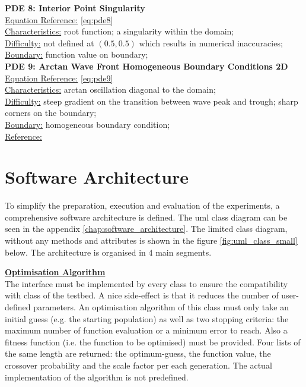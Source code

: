 \documentclass[./\jobname.tex]{subfiles}
\begin{document}
\textbf{PDE 8: Interior Point Singularity} \\
\underline{Equation Reference:} \eqref{eq:pde8} \\
\underline{Characteristics:} root function; a singularity within the domain; \\
\underline{Difficulty:} not defined at $(0.5, 0.5)$ which results in numerical inaccuracies; \\
\underline{Boundary:} function value on boundary; \\

\textbf{PDE 9: Arctan Wave Front Homogeneous Boundary Conditions 2D} \\
\underline{Equation Reference:} \eqref{eq:pde9} \\
\underline{Characteristics:} arctan oscillation diagonal to the domain;  \\
\underline{Difficulty:} steep gradient on the transition between wave peak and trough; sharp corners on the boundary; \\
\underline{Boundary:} homogeneous boundary condition; \\
\underline{Reference:} \cite{mitchell_nist_2018} \\


\section{Software Architecture}
\label{chap:software_architecutre}

To simplify the preparation, execution and evaluation of the experiments, a comprehensive software architecture is defined. The \gls{uml} class diagram can be seen in the appendix \ref{chap:software_architecture}. The limited class diagram, without any methods and attributes is shown in the figure \ref{fig:uml_class_small} below. The architecture is organised in 4 main segments. 

\large \underline{\textbf{Optimisation Algorithm}} \\
The  interface must be implemented by every  class to ensure the compatibility with  class of the testbed. A nice side-effect is that it reduces the number of user-defined parameters. An optimisation algorithm of this class must only take an initial guess (e.g. the starting population) as well as two stopping criteria: the maximum number of function evaluation or a minimum error to reach. Also a fitness function (i.e. the function to be optimised) must be provided. Four lists of the same length are returned: the optimum-guess, the function value, the crossover probability and the scale factor per each generation. The actual implementation of the algorithm is not predefined. 
\end{document}
